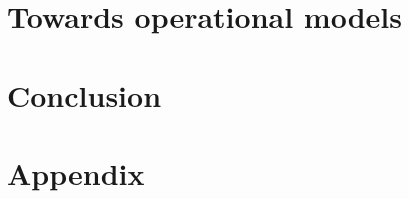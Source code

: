 














\cleardoublepage %





\part{Towards operational models} %









\ctparttext{}


\part*{Conclusion}





% 

\cleardoublepage %



\part{Appendix} %

